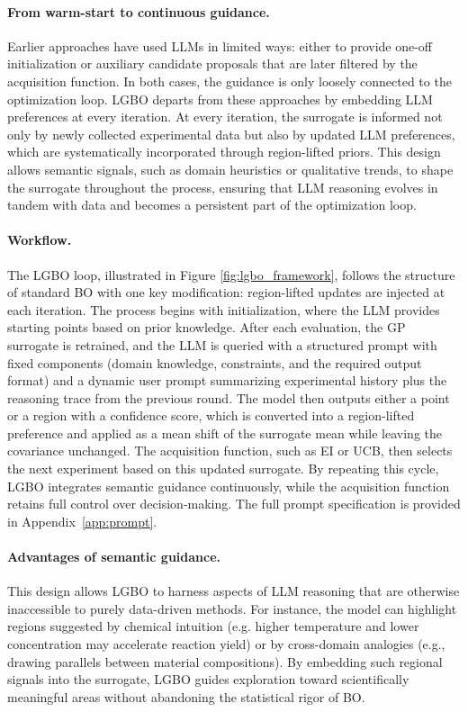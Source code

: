 \documentclass{article} %
\begin{document}
\paragraph{From warm-start to continuous guidance.}  
Earlier approaches have used LLMs in limited ways: either to provide one-off initialization or auxiliary candidate proposals that are later filtered by the acquisition function. In both cases, the guidance is only loosely connected to the optimization loop. LGBO departs from these approaches by embedding LLM preferences at every iteration.
At every iteration, the surrogate is informed not only by newly collected experimental data but also by updated LLM preferences, which are systematically incorporated through region-lifted priors. This design allows semantic signals, such as domain heuristics or qualitative trends, to shape the surrogate throughout the process, ensuring that LLM reasoning evolves in tandem with data and becomes a persistent part of the optimization loop.

\paragraph{Workflow.}
The LGBO loop, illustrated in Figure \ref{fig:lgbo_framework}, follows the structure of standard BO with one key modification: region-lifted updates are injected at each iteration. The process begins with initialization, where the LLM provides starting points based on prior knowledge. After each evaluation, the GP surrogate is retrained, and the LLM is queried with a structured prompt with fixed components (domain knowledge, constraints, and the required output format) and a dynamic user prompt summarizing experimental history plus the reasoning trace from the previous round. The model then outputs either a point or a region with a confidence score, which is converted into a region-lifted preference and applied as a mean shift of the surrogate mean while leaving the covariance unchanged. The acquisition function, such as EI or UCB, then selects the next experiment based on this updated surrogate. By repeating this cycle, LGBO integrates semantic guidance continuously, while the acquisition function retains full control over decision-making. The full prompt specification is provided in Appendix~\ref{app:prompt}.


\paragraph{Advantages of semantic guidance.}  
This design allows LGBO to harness aspects of LLM reasoning that are otherwise inaccessible to purely data-driven methods.  
For instance, the model can highlight regions suggested by chemical intuition (e.g. higher temperature and lower concentration may accelerate reaction yield) or by cross-domain analogies (e.g., drawing parallels between material compositions).  
By embedding such regional signals into the surrogate, LGBO guides exploration toward scientifically meaningful areas without abandoning the statistical rigor of BO.  
\end{document}
